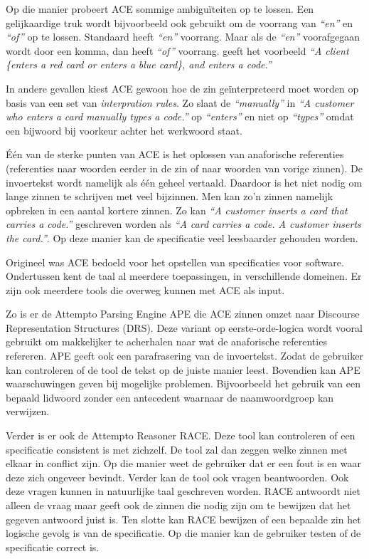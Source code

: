 \documentclass[]{article}
\newcommand{\example}[1]{\textit{``#1''}}
\begin{document}
Op die manier probeert ACE sommige ambiguïteiten op te lossen. Een gelijkaardige
truk wordt bijvoorbeeld ook gebruikt om de voorrang van \example{en} en
\example{of} op te lossen. Standaard heeft \example{en} voorrang. Maar als de
\example{en} voorafgegaan wordt door een komma, dan heeft \example{of} voorrang.
\cite{ACEConstructionRules} geeft het voorbeeld \example{A client \{enters a red
  card or enters a blue card\}, and enters a code.}

In andere gevallen kiest ACE gewoon hoe de zin geïnterpreteerd moet worden op
basis van een set van \textit{interpration rules}. Zo slaat de
\example{manually} in \example{A customer who {enters a card manually} types
  a code.}\cite{ACEConstructionRules} op \example{enters} en niet op
\example{types} omdat een bijwoord bij voorkeur achter het werkwoord staat.

Één van de sterke punten van ACE is het oplossen van anaforische referenties
(referenties naar woorden eerder in de zin of naar woorden van vorige zinnen).
De invoertekst wordt namelijk als één geheel vertaald. Daardoor is het niet
nodig om lange zinnen te schrijven met veel bijzinnen. Men kan zo'n zinnen
namelijk opbreken in een aantal kortere zinnen. Zo kan \example{A customer
  inserts a card that carries a code.} geschreven worden als \example{A card
  carries a code. A customer inserts the card.}\cite{Fuchs2008}. Op deze manier
kan de specificatie veel leesbaarder gehouden worden.

Origineel was ACE bedoeld voor het opstellen van specificaties voor software.
Ondertussen kent de taal al meerdere toepassingen, in verschillende domeinen. Er
zijn ook meerdere tools die overweg kunnen met ACE als input.

Zo is er de Attempto Parsing Engine APE die ACE zinnen omzet naar Discourse
Representation Structures (DRS). Deze variant op eerste-orde-logica wordt vooral
gebruikt om makkelijker te acherhalen naar wat de anaforische referenties
refereren. APE geeft ook een parafrasering van de invoertekst. Zodat de
gebruiker kan controleren of de tool de tekst op de juiste manier leest.
Bovendien kan APE waarschuwingen geven bij mogelijke problemen. Bijvoorbeeld het
gebruik van een bepaald lidwoord zonder een antecedent waarnaar de
naamwoordgroep kan verwijzen.

Verder is er ook de Attempto Reasoner RACE. Deze tool kan controleren of een
specificatie consistent is met zichzelf. De tool zal dan zeggen welke zinnen met
elkaar in conflict zijn. Op die manier weet de gebruiker dat er een fout is en
waar deze zich ongeveer bevindt. Verder kan de tool ook vragen beantwoorden. Ook
deze vragen kunnen in natuurlijke taal geschreven worden. RACE antwoordt niet
alleen de vraag maar geeft ook de zinnen die nodig zijn om te bewijzen dat het
gegeven antwoord juist is. Ten slotte kan RACE bewijzen of een bepaalde zin het
logische gevolg is van de specificatie. Op die manier kan de gebruiker testen of
de specificatie correct is.
\end{document}
